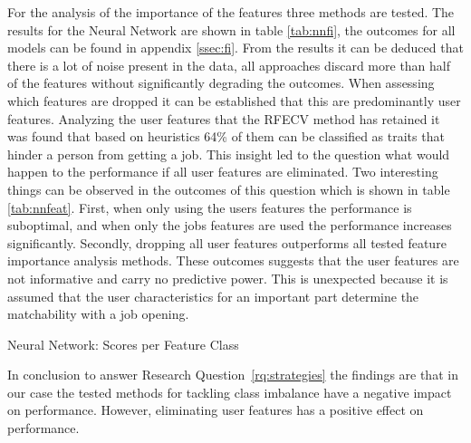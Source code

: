 For the analysis of the importance of the features three methods are tested. 
The results for the Neural Network are shown in table \ref{tab:nnfi}, the outcomes for all models can be found in appendix \ref{ssec:fi}.
From the results it can be deduced that there is a lot of noise present in the data, all approaches discard more than half of the features without significantly degrading the outcomes.
When assessing which features are dropped it can be established that this are predominantly user features.
Analyzing the user features that the RFECV method has retained it was found that based on heuristics 64\% of them can be classified as traits that hinder a person from getting a job.
This insight led to the question what would happen to the performance if all user features are eliminated.
Two interesting things can be observed in the outcomes of this question which is shown in table \ref{tab:nnfeat}.
First, when only using the users features the performance is suboptimal, and when only the jobs features are used the performance increases significantly.
Secondly, dropping all user features outperforms all tested feature importance analysis methods.
These outcomes suggests that the user features are not informative and carry no predictive power.
This is unexpected because it is assumed that the user characteristics for an important part determine the matchability with a job opening.

\begin{table}[h]
\begin{footnotesize}

\end{footnotesize}
\caption{\label{tab:nnfeat} \footnotesize{Neural Network: Scores per Feature Class}}
\end{table}

In conclusion to answer Research Question~\ref{rq:strategies} the findings are that in our case the tested methods for tackling class imbalance have a negative impact on performance.
However, eliminating user features has a positive effect on performance.

